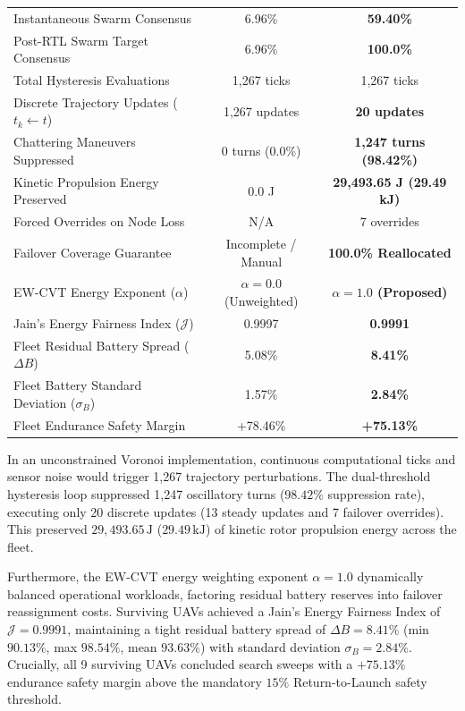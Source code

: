 \documentclass[conference]{IEEEtran}
\begin{document}
\begin{table}[htbp]
{\begin{tabular}{lcc}
Instantaneous Swarm Consensus & 6.96\% & \textbf{59.40\%} \\
Post-RTL Swarm Target Consensus & 6.96\% & \textbf{100.0\%} \\
\midrule
Total Hysteresis Evaluations & 1,267 ticks & 1,267 ticks \\
Discrete Trajectory Updates ($t_k \leftarrow t$) & 1,267 updates & \textbf{20 updates} \\
Chattering Maneuvers Suppressed & 0 turns (0.0\%) & \textbf{1,247 turns (98.42\%)} \\
Kinetic Propulsion Energy Preserved & 0.0 J & \textbf{29,493.65 J (29.49 kJ)} \\
Forced Overrides on Node Loss & N/A & 7 overrides \\
Failover Coverage Guarantee & Incomplete / Manual & \textbf{100.0\% Reallocated} \\
EW-CVT Energy Exponent ($\alpha$) & $\alpha = 0.0$ (Unweighted) & \textbf{$\alpha = 1.0$ (Proposed)} \\
Jain's Energy Fairness Index ($\mathcal{J}$) & 0.9997 & \textbf{0.9991} \\
Fleet Residual Battery Spread ($\Delta B$) & 5.08\% & \textbf{8.41\%} \\
Fleet Battery Standard Deviation ($\sigma_B$) & 1.57\% & \textbf{2.84\%} \\
Fleet Endurance Safety Margin & +78.46\% & \textbf{+75.13\%} \\
\bottomrule
\end{tabular}
}
\end{table}

In an unconstrained Voronoi implementation, continuous computational ticks and sensor noise would trigger 1,267 trajectory perturbations. The dual-threshold hysteresis loop suppressed 1,247 oscillatory turns ($98.42\%$ suppression rate), executing only 20 discrete updates (13 steady updates and 7 failover overrides). This preserved $29,493.65\,\text{J}$ ($29.49\,\text{kJ}$) of kinetic rotor propulsion energy across the fleet.

Furthermore, the EW-CVT energy weighting exponent $\alpha = 1.0$ dynamically balanced operational workloads, factoring residual battery reserves into failover reassignment costs. Surviving UAVs achieved a Jain's Energy Fairness Index of $\mathcal{J} = 0.9991$, maintaining a tight residual battery spread of $\Delta B = 8.41\%$ (min $90.13\%$, max $98.54\%$, mean $93.63\%$) with standard deviation $\sigma_B = 2.84\%$. Crucially, all 9 surviving UAVs concluded search sweeps with a $+75.13\%$ endurance safety margin above the mandatory $15\%$ Return-to-Launch safety threshold.
\end{document}
